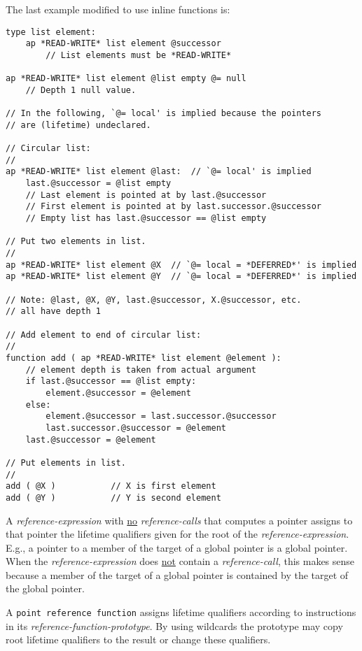\documentclass[12pt]{article}
\newenvironment{indpar}[1][0.3in]%
	{\begin{list}{}%
		     {\setlength{\itemsep}{0in}%
		      \setlength{\topsep}{0in}%
		      \setlength{\parsep}{1ex}%
		      \setlength{\labelwidth}{#1}%
		      \setlength{\leftmargin}{#1}%
		      \addtolength{\leftmargin}{\labelsep}}%
	 \item}%
	{\end{list}}
\begin{document}
The last example modified to use inline functions is:
\begin{indpar}\begin{verbatim}
type list element:
    ap *READ-WRITE* list element @successor
        // List elements must be *READ-WRITE*

ap *READ-WRITE* list element @list empty @= null
    // Depth 1 null value.

// In the following, `@= local' is implied because the pointers
// are (lifetime) undeclared.

// Circular list:
//
ap *READ-WRITE* list element @last:  // `@= local' is implied
    last.@successor = @list empty
    // Last element is pointed at by last.@successor
    // First element is pointed at by last.successor.@successor
    // Empty list has last.@successor == @list empty

// Put two elements in list.
//
ap *READ-WRITE* list element @X  // `@= local = *DEFERRED*' is implied
ap *READ-WRITE* list element @Y  // `@= local = *DEFERRED*' is implied

// Note: @last, @X, @Y, last.@successor, X.@successor, etc.
// all have depth 1

// Add element to end of circular list:
//
function add ( ap *READ-WRITE* list element @element ):
    // element depth is taken from actual argument
    if last.@successor == @list empty:
        element.@successor = @element
    else:
        element.@successor = last.successor.@successor
        last.successor.@successor = @element
    last.@successor = @element

// Put elements in list.
//
add ( @X )           // X is first element
add ( @Y )           // Y is second element
\end{verbatim}\end{indpar}

A {\em reference-expression} with \underline{no} {\em reference-calls}
that computes a pointer assigns to that
pointer the lifetime qualifiers given for the root of the
{\em reference-expression}.  E.g., a pointer to a member of the
target of a global pointer is a global pointer.  When the
{\em reference-expression} does \underline{not} contain a
{\em reference-call}, this makes sense because a member of the
target of a global pointer is contained by the target of the global
pointer.

A {\tt point reference function} assigns lifetime qualifiers according
to instructions in its {\em reference-function-prototype}.  By using
wildcards the prototype may copy root lifetime qualifiers to the
result or change these qualifiers.
\end{document}
